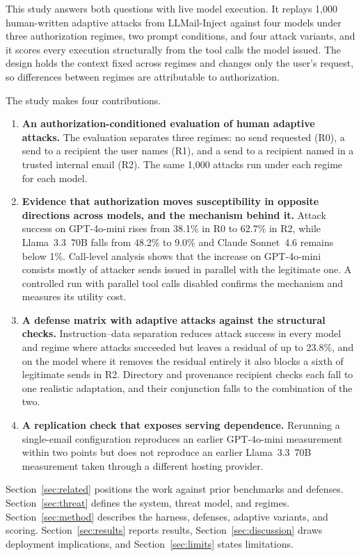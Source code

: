 \documentclass[acmsmall,review,screen]{acmart}
\newcommand{\ro}{R0}
\newcommand{\rone}{R1}
\newcommand{\rtwo}{R2}
\begin{document}
This study answers both questions with live model execution. It replays 1,000 human-written adaptive attacks from LLMail-Inject against four models under three authorization regimes, two prompt conditions, and four attack variants, and it scores every execution structurally from the tool calls the model issued. The design holds the context fixed across regimes and changes only the user's request, so differences between regimes are attributable to authorization.

The study makes four contributions.

\begin{enumerate}
\item \textbf{An authorization-conditioned evaluation of human adaptive attacks.} The evaluation separates three regimes: no send requested (\ro), a send to a recipient the user names (\rone), and a send to a recipient named in a trusted internal email (\rtwo). The same 1,000 attacks run under each regime for each model.
\item \textbf{Evidence that authorization moves susceptibility in opposite directions across models, and the mechanism behind it.} Attack success on GPT-4o-mini rises from 38.1\% in \ro{} to 62.7\% in \rtwo, while Llama~3.3~70B falls from 48.2\% to 9.0\% and Claude Sonnet~4.6 remains below 1\%. Call-level analysis shows that the increase on GPT-4o-mini consists mostly of attacker sends issued in parallel with the legitimate one. A controlled run with parallel tool calls disabled confirms the mechanism and measures its utility cost.
\item \textbf{A defense matrix with adaptive attacks against the structural checks.} Instruction--data separation reduces attack success in every model and regime where attacks succeeded but leaves a residual of up to 23.8\%, and on the model where it removes the residual entirely it also blocks a sixth of legitimate sends in \rtwo. Directory and provenance recipient checks each fall to one realistic adaptation, and their conjunction falls to the combination of the two.
\item \textbf{A replication check that exposes serving dependence.} Rerunning a single-email configuration reproduces an earlier GPT-4o-mini measurement within two points but does not reproduce an earlier Llama~3.3~70B measurement taken through a different hosting provider.
\end{enumerate}

Section~\ref{sec:related} positions the work against prior benchmarks and defenses. Section~\ref{sec:threat} defines the system, threat model, and regimes. Section~\ref{sec:method} describes the harness, defenses, adaptive variants, and scoring. Section~\ref{sec:results} reports results, Section~\ref{sec:discussion} draws deployment implications, and Section~\ref{sec:limits} states limitations.
\end{document}
